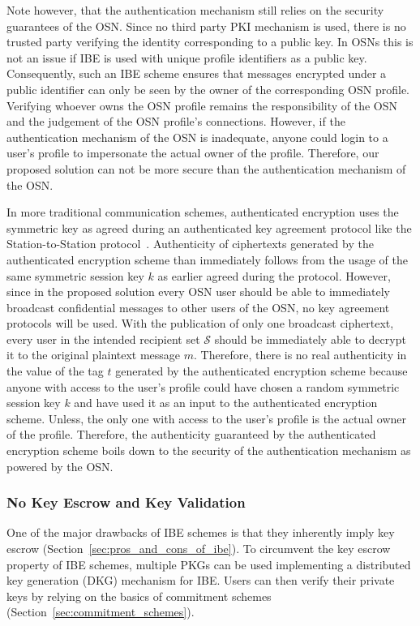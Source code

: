 Note however, that the authentication mechanism still relies on the security guarantees of the OSN. Since no third party PKI mechanism is used, there is no trusted party verifying the identity corresponding to a public key. In OSNs this is not an issue if IBE is used with unique profile identifiers as a public key. Consequently, such an IBE scheme ensures that messages encrypted under a public identifier can only be seen by the owner of the corresponding OSN profile. Verifying whoever owns the OSN profile remains the responsibility of the OSN and the judgement of the OSN profile's connections. However, if the authentication mechanism of the OSN is inadequate, anyone could login to a user's profile to impersonate the actual owner of the profile. Therefore, our proposed solution can not be more secure than the authentication mechanism of the OSN.

In more traditional communication schemes, authenticated encryption uses the symmetric key as agreed during an authenticated key agreement protocol like the Station-to-Station protocol~\cite{art:DiffieOW92}. Authenticity of ciphertexts generated by the authenticated encryption scheme than immediately follows from the usage of the same symmetric session key $k$ as earlier agreed during the protocol. However, since in the proposed solution every OSN user should be able to immediately broadcast confidential messages to other users of the OSN, no key agreement protocols will be used. With the publication of only one broadcast ciphertext, every user in the intended recipient set $\mathcal{S}$ should be immediately able to decrypt it to the original plaintext message $m$. Therefore, there is no real authenticity in the value of the tag $t$ generated by the authenticated encryption scheme because anyone with access to the user's profile could have chosen a random symmetric session key $k$ and have used it as an input to the authenticated encryption scheme. Unless, the only one with access to the user's profile is the actual owner of the profile. Therefore, the authenticity guaranteed by the authenticated encryption scheme boils down to the security of the authentication mechanism as powered by the OSN.


\subsubsection{No Key Escrow and Key Validation}
One of the major drawbacks of IBE schemes is that they inherently imply key escrow (Section~\ref{sec:pros_and_cons_of_ibe}). To circumvent the key escrow property of IBE schemes, multiple PKGs can be used implementing a distributed key generation (DKG) mechanism for IBE. Users can then verify their private keys by relying on the basics of commitment schemes (Section~\ref{sec:commitment_schemes}).

